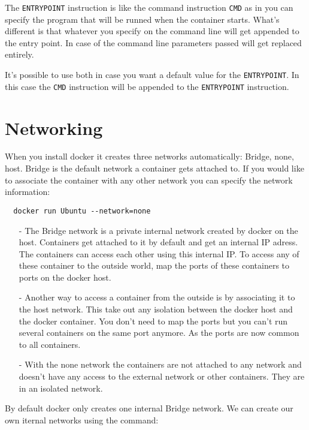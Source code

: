 \documentclass[french]{article}
\begin{document}
The \verb|ENTRYPOINT| instruction is like the command instruction \verb|CMD| as in you can specify the program that will be runned when the container starts. What's different is that whatever you specify on the command line will get appended to the entry point. In case of the command line parameters passed will get replaced entirely.

It's possible to use both in case you want a default value for the \verb|ENTRYPOINT|. In this case the \verb|CMD| instruction will be appended to the \verb|ENTRYPOINT| instruction.

\section{Networking}

When you install docker it creates three networks automatically: Bridge, none, host. Bridge is the default network a container gets attached to. If you would like to associate the container with any other network you can specify the network information:
\begin{verbatim}
  docker run Ubuntu --network=none
\end{verbatim}
\begin{itemize}
  \item [-] The Bridge network is a private internal network created by docker on the host. Containers get attached to it by default and get an internal IP adress. The containers can access each other using this internal IP. To access any of these container to the outside world, map the ports of these containers to ports on the docker host.
  \item [-] Another way to access a container from the outside is by associating it to the host network. This take out any isolation between the docker host and the docker container. You don't need to map the ports but you can't run several containers on the same port anymore. As the ports are now common to all containers.
  \item [-] With the none network the containers are not attached to any network and doesn't have any access to the external network or other containers. They are in an isolated network.
\end{itemize}

By default docker only creates one internal Bridge network. We can create our own iternal networks using the command:
\begin{verbatim}

\end{verbatim}
\end{document}
